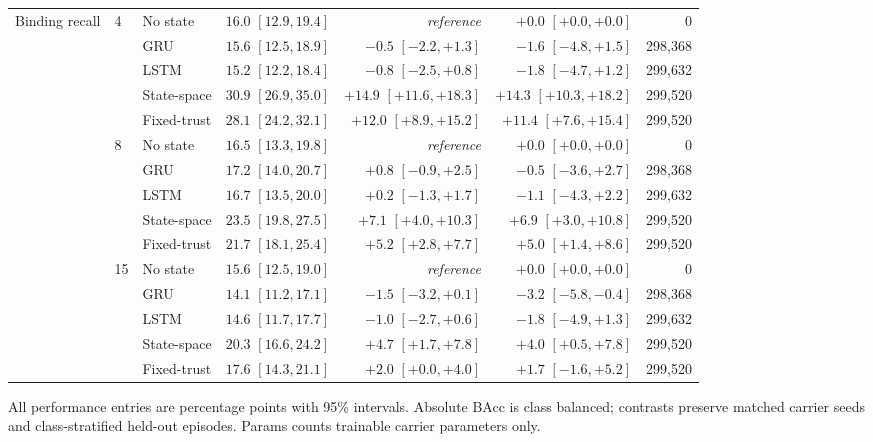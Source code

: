 \begin{table}[H]
\begin{tabular}{lllrrrr}
Binding recall & 4 & No state & $16.0$ $[12.9,19.4]$ & \textit{reference} & $+0.0$ $[+0.0,+0.0]$ & 0 \\
 &  & GRU & $15.6$ $[12.5,18.9]$ & $-0.5$ $[-2.2,+1.3]$ & $-1.6$ $[-4.8,+1.5]$ & 298{,}368 \\
 &  & LSTM & $15.2$ $[12.2,18.4]$ & $-0.8$ $[-2.5,+0.8]$ & $-1.8$ $[-4.7,+1.2]$ & 299{,}632 \\
 &  & State-space & $30.9$ $[26.9,35.0]$ & $+14.9$ $[+11.6,+18.3]$ & $+14.3$ $[+10.3,+18.2]$ & 299{,}520 \\
 &  & Fixed-trust & $28.1$ $[24.2,32.1]$ & $+12.0$ $[+8.9,+15.2]$ & $+11.4$ $[+7.6,+15.4]$ & 299{,}520 \\
\addlinespace[1pt]
 & 8 & No state & $16.5$ $[13.3,19.8]$ & \textit{reference} & $+0.0$ $[+0.0,+0.0]$ & 0 \\
 &  & GRU & $17.2$ $[14.0,20.7]$ & $+0.8$ $[-0.9,+2.5]$ & $-0.5$ $[-3.6,+2.7]$ & 298{,}368 \\
 &  & LSTM & $16.7$ $[13.5,20.0]$ & $+0.2$ $[-1.3,+1.7]$ & $-1.1$ $[-4.3,+2.2]$ & 299{,}632 \\
 &  & State-space & $23.5$ $[19.8,27.5]$ & $+7.1$ $[+4.0,+10.3]$ & $+6.9$ $[+3.0,+10.8]$ & 299{,}520 \\
 &  & Fixed-trust & $21.7$ $[18.1,25.4]$ & $+5.2$ $[+2.8,+7.7]$ & $+5.0$ $[+1.4,+8.6]$ & 299{,}520 \\
\addlinespace[1pt]
 & 15 & No state & $15.6$ $[12.5,19.0]$ & \textit{reference} & $+0.0$ $[+0.0,+0.0]$ & 0 \\
 &  & GRU & $14.1$ $[11.2,17.1]$ & $-1.5$ $[-3.2,+0.1]$ & $-3.2$ $[-5.8,-0.4]$ & 298{,}368 \\
 &  & LSTM & $14.6$ $[11.7,17.7]$ & $-1.0$ $[-2.7,+0.6]$ & $-1.8$ $[-4.9,+1.3]$ & 299{,}632 \\
 &  & State-space & $20.3$ $[16.6,24.2]$ & $+4.7$ $[+1.7,+7.8]$ & $+4.0$ $[+0.5,+7.8]$ & 299{,}520 \\
 &  & Fixed-trust & $17.6$ $[14.3,21.1]$ & $+2.0$ $[+0.0,+4.0]$ & $+1.7$ $[-1.6,+5.2]$ & 299{,}520 \\
\bottomrule
\end{tabular}
\vspace{2pt}
\parbox{0.98\textwidth}{\scriptsize All performance entries are percentage points with 95\% intervals. Absolute BAcc is class balanced; contrasts preserve matched carrier seeds and class-stratified held-out episodes. Params counts trainable carrier parameters only.}
\end{table}
